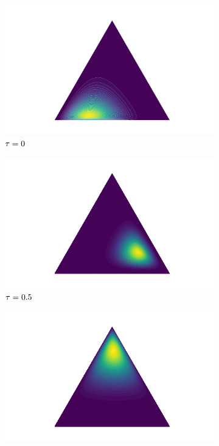 \begin{figure}[H]
\centering
    \begin{subfigure}{0.25\textwidth}
        \centering
        \includegraphics[width=\linewidth]{sections/010_neurips2019/paper/images/0.png}
        \caption{$\tau = 0$}
    \end{subfigure}
    \hspace{-0.4cm}
    \begin{subfigure}{0.25\textwidth}
        \centering
        \includegraphics[width=\linewidth]{sections/010_neurips2019/paper/images/13.png}
        \caption{$\tau = 0.5$}
    \end{subfigure}
    \hspace{-0.4cm}
    \begin{subfigure}{0.25\textwidth}
        \centering
        \includegraphics[width=\linewidth]{sections/010_neurips2019/paper/images/33.png}

\end{subfigure}
\end{figure}
